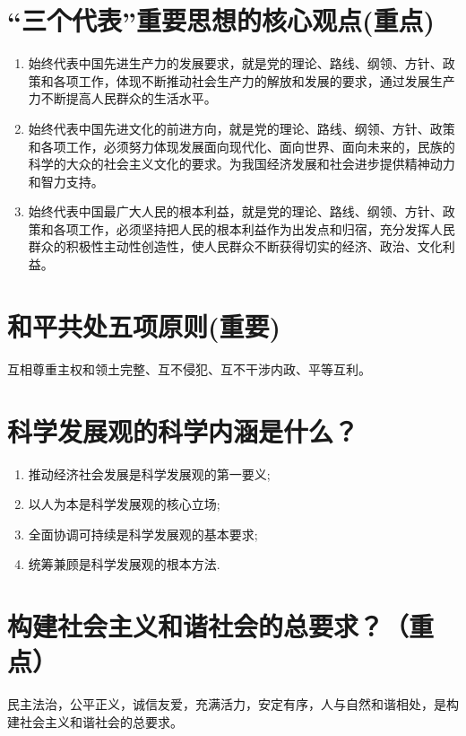 \documentclass[12pt, a4paper, oneside]{ctexbook}
\begin{document}
\section{“三个代表”重要思想的核心观点(重点)}

\begin{enumerate}[label=（\arabic*）]
\item 始终代表中国先进生产力的发展要求，就是党的理论、路线、纲领、方针、政策和各项工作，体现不断推动社会生产力的解放和发展的要求，通过发展生产力不断提高人民群众的生活水平。

\item 始终代表中国先进文化的前进方向，就是党的理论、路线、纲领、方针、政策和各项工作，必须努力体现发展面向现代化、面向世界、面向未来的，民族的科学的大众的社会主义文化的要求。为我国经济发展和社会进步提供精神动力和智力支持。

\item 始终代表中国最广大人民的根本利益，就是党的理论、路线、纲领、方针、政策和各项工作，必须坚持把人民的根本利益作为出发点和归宿，充分发挥人民群众的积极性主动性创造性，使人民群众不断获得切实的经济、政治、文化利益。
\end{enumerate}


\section{和平共处五项原则(重要)}

互相尊重主权和领土完整、互不侵犯、互不干涉内政、平等互利。

\section{科学发展观的科学内涵是什么？}
\begin{enumerate}[label=（\arabic*）]
\item 推动经济社会发展是科学发展观的第一要义;
\item 以人为本是科学发展观的核心立场;
\item 全面协调可持续是科学发展观的基本要求;
\item 统筹兼顾是科学发展观的根本方法.
\end{enumerate}

\section{构建社会主义和谐社会的总要求？（重点）}

民主法治，公平正义，诚信友爱，充满活力，安定有序，人与自然和谐相处，是构建社会主义和谐社会的总要求。
\end{document}
